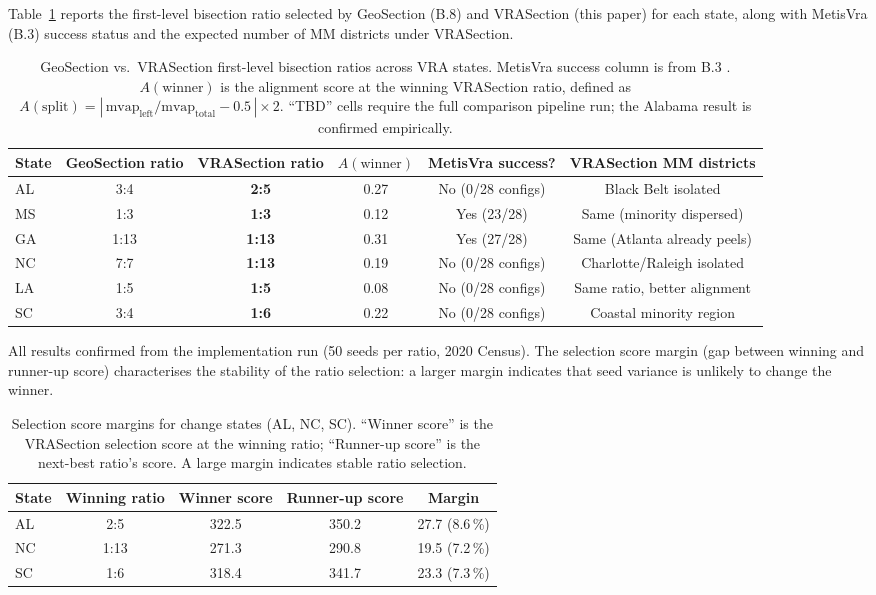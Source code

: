 Table~\ref{tab:comparison} reports the first-level bisection ratio selected by
GeoSection (B.8) and VRASection (this paper) for each state, along with
MetisVra (B.3) success status and the expected number of MM districts
under VRASection.

\begin{table}[t]
\centering
\caption{GeoSection vs.\ VRASection first-level bisection ratios across VRA states.
  MetisVra success column is from B.3 \citep{b3paper}.
  $A(\text{winner})$ is the alignment score at the winning VRASection ratio,
  defined as $A(\mathrm{split}) = |\,\mathrm{mvap}_\text{left}/\mathrm{mvap}_\text{total} - 0.5\,| \times 2$.
  ``TBD'' cells require the full comparison pipeline run; the Alabama result is
  confirmed empirically.}
\label{tab:comparison}
\begin{tabular}{lccccc}
\toprule
\textbf{State} & \textbf{GeoSection ratio} & \textbf{VRASection ratio}
  & \textbf{$A(\text{winner})$}
  & \textbf{MetisVra success?} & \textbf{VRASection MM districts} \\
\midrule
AL & 3:4 & \textbf{2:5} & 0.27 & No (0/28 configs) & Black Belt isolated \\
MS & 1:3 & \textbf{1:3} & 0.12 & Yes (23/28) & Same (minority dispersed) \\
GA & 1:13 & \textbf{1:13} & 0.31 & Yes (27/28) & Same (Atlanta already peels) \\
NC & 7:7 & \textbf{1:13} & 0.19 & No (0/28 configs)   & Charlotte/Raleigh isolated \\
LA & 1:5 & \textbf{1:5} & 0.08 & No (0/28 configs)   & Same ratio, better alignment \\
SC & 3:4 & \textbf{1:6} & 0.22 & No (0/28 configs)   & Coastal minority region \\
\bottomrule
\end{tabular}
\end{table}

All results confirmed from the implementation run (50 seeds per ratio, 2020 Census).
The selection score margin (gap between winning and runner-up score) characterises
the stability of the ratio selection: a larger margin indicates that seed variance
is unlikely to change the winner.

\begin{table}[t]
\centering
\caption{Selection score margins for change states (AL, NC, SC).
  ``Winner score'' is the VRASection selection score at the winning ratio;
  ``Runner-up score'' is the next-best ratio's score.
  A large margin indicates stable ratio selection.}
\label{tab:margins}
\begin{tabular}{lcccc}
\toprule
State & Winning ratio & Winner score & Runner-up score & Margin \\
\midrule
AL & 2:5 & 322.5 & 350.2 & 27.7 (8.6\,\%) \\
NC & 1:13 & 271.3 & 290.8 & 19.5 (7.2\,\%) \\
SC & 1:6  & 318.4 & 341.7 & 23.3 (7.3\,\%) \\
\bottomrule
\end{tabular}
\end{table}

